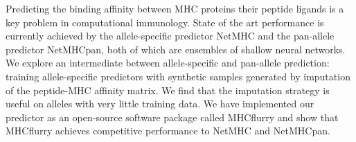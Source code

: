 Predicting the binding affinity between MHC proteins their peptide ligands is a key problem in computational immunology. State of the art performance is currently achieved by the allele-specific predictor NetMHC and the pan-allele predictor NetMHCpan, both of which are ensembles of shallow neural networks. We explore an intermediate between allele-specific and pan-allele prediction: training allele-specific predictors with synthetic samples generated by imputation of the peptide-MHC affinity matrix. We find that the imputation strategy is useful on alleles with very little training data. We have implemented our predictor as an open-source software package called MHCflurry and show that MHCflurry achieves competitive performance to NetMHC and NetMHCpan.